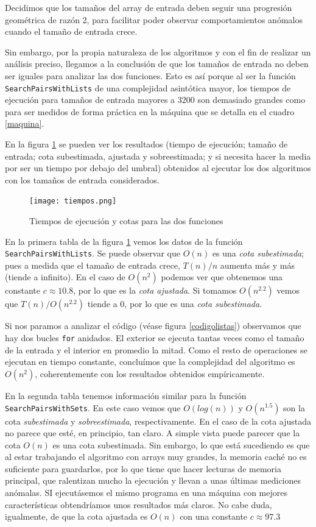 \documentclass[a4paper, titlepage]{article}
\begin{document}
Decidimos que los tamaños del array de entrada deben seguir una progresión geométrica de razón 2, para facilitar poder observar comportamientos anómalos cuando el tamaño de entrada crece.

Sin embargo, por la propia naturaleza de los algoritmos y con el fin de realizar un análisis preciso, llegamos a la conclusión de que los tamaños de entrada no  deben ser iguales para analizar las dos funciones. Esto es así porque al ser la función \texttt{SearchPairsWithLists} de una complejidad asintótica mayor, los tiempos de ejecución para tamaños de entrada mayores a 3200 son demasiado grandes como para ser medidos de forma práctica en la máquina que se detalla en el cuadro \ref{maquina}.

En la figura \ref{cotas} se pueden ver los resultados (tiempo de ejecución; tamaño de entrada; cota subestimada, ajustada y sobreestimada; y si necesita hacer la media por ser un tiempo por debajo del umbral) obtenidos al ejecutar los dos algoritmos con los tamaños de entrada considerados.

\begin{figure}[H]


\texttt{[image: tiempos.png]}


\caption{Tiempos  de ejecución y cotas para las dos funciones}
\label{cotas}

\end{figure}

En la primera tabla de la figura \ref{cotas} vemos los datos de la función \texttt{SearchPairsWithLists}. Se puede observar que $O(n)$ es una \emph{cota subestimada}; pues a medida que el tamaño de entrada crece, $T(n)/n$ aumenta más y más (tiende a infinito). En el caso de $O(n^2)$ podemos ver que obtenemos una constante $c \approx 10.8$, por lo que es la \emph{cota ajustada}. Si tomamos $O(n^{2.2})$ vemos que $T(n)/O(n^{2.2})$ tiende a  0, por lo que es una \emph{cota subestimada}.

Si nos paramos a analizar el código (véase figura \ref{codigolistas}) observamos que hay dos bucles \texttt{for} anidados. El exterior se ejecuta tantas veces como el tamaño de la entrada y el interior en promedio la mitad. Como el resto de operaciones se ejecutan en tiempo constante, concluímos que la complejidad del algoritmo es $O(n^2)$, coherentemente con los resultados obtenidos empíricamente.

En la segunda tabla tenemos información similar para la función \texttt{SearchPairsWithSets}. En este caso vemos que $O(log(n))$ y $O(n^{1.5})$ son la cota 	\emph{subestimada} y \emph{sobreestimada}, respectivamente. En el caso de la cota ajustada no parece que esté, en principio, tan claro. A simple vista puede parecer que la cota $O(n)$ es una cota subestimada. Sin embargo, lo que está sucediendo es que al estar trabajando el algoritmo con arrays muy grandes, la memoria caché no es suficiente para guardarlos, por lo que tiene que hacer lecturas de memoria principal, que ralentizan mucho la ejecución y llevan a unas últimas mediciones anómalas. SI ejecutásemos el mismo programa en una máquina con mejores características obtendríamos unos resultados más claros. No cabe duda, igualmente, de que la cota ajustada es $O(n)$ con una constante $c \approx 97.3$
\end{document}
